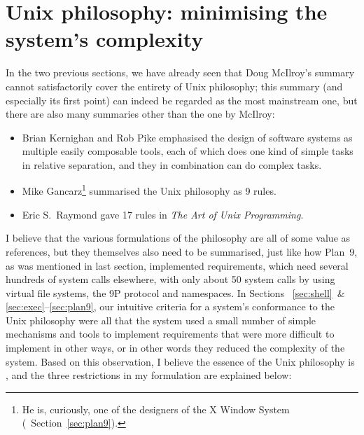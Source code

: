 \section{Unix philosophy: minimising the system's complexity}\label{sec:complex}

In the two previous sections, we have already seen that Doug McIlroy's
summary cannot satisfactorily cover the entirety of Unix philosophy;
this summary (and especially its first point) can indeed be regarded as
the most mainstream one, but there are also many summaries other than
the one by McIlroy:
\begin{itemize}
\item Brian Kernighan and Rob Pike emphasised the design of software systems as
	multiple easily composable tools, each of which does one kind of simple
	tasks in relative separation, and they in combination can do complex tasks.
\item Mike Gancarz\footnote{He is, curiously, one of the designers of the
	X Window System (\cf~Section~\ref{sec:plan9}).} summarised
	the Unix philosophy as 9 rules.
\item Eric S.\ Raymond gave 17 rules in \emph{The Art of Unix Programming}.
\end{itemize}
I believe that the various formulations of the philosophy are all of some value
as references, but they themselves also need to be summarised, just like how
Plan~9, as was mentioned in last section, implemented requirements, which need
several hundreds of system calls elsewhere, with only about 50 system calls
by using virtual file systems, the 9P protocol and namespaces.  In Sections~%
\ref{sec:shell}~\& \ref{sec:exec}--\ref{sec:plan9}, our intuitive criteria
for a system's conformance to the Unix philosophy were all that the
system used a small number of simple mechanisms and tools to implement
requirements that were more difficult to implement in other ways, or in other
words they reduced the complexity of the system.  Based on this observation,
I believe the essence of the Unix philosophy is ,
and the three restrictions in my formulation are explained below:
